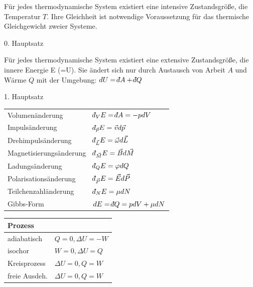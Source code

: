 \documentclass[12pt,a4paper, twoside]{article}
\renewcommand{\=}[1]{\stackrel{#1}{=}}
\def\dbar{{\mathchar'26\mkern-12mu d}}
\def\dbar{{\mathchar'26\mkern-12mu d}}
\theoremstyle{definition}
\theoremstyle{remark}
\begin{document}
\begin{center}
\begin{framed} \noindent Für jedes thermodynamische System existiert eine intensive Zustandsgröße, die Temperatur $T$. Ihre Gleichheit ist notwendige Voraussetzung für das thermische Gleichgewicht zweier Systeme.
\begin{center} 0. Hauptsatz\end{center}\end{framed}
\end{center}

\begin{center}
\begin{framed}
\noindent Für jedes thermodynamische System existiert eine extensive Zustandsgröße, die innere Energie E (=U). Sie ändert sich nur durch Austausch von Arbeit $A$ und Wärme $Q$ mit der Umgebung: $dU = \dbar A + \dbar Q$
\begin{center} 1. Hauptsatz\end{center}\end{framed}
\end{center}

\begin{center}
\begin{framed}
\begin{tabular}{ll}
Volumenänderung & $\dbar_V E = \dbar A = - p dV$\\
Impulsänderung & $\dbar_{\vec p}E = \vec v d\vec p$\\
Drehimpulsänderung & $\dbar_{\vec L}E = \vec \omega d\vec L$\\
Magnetisierungsänderung & $\dbar_{\vec M}E = \vec B d\vec M$\\
Ladungsänderung & $\dbar_Q E = \varphi dQ$\\
Polarisationsänderung & $\dbar_{\vec P}E = \vec E d\vec P$\\
Teilchenzahländerung & $\dbar_N E = \mu dN$\\
Gibbs-Form & $dE = \dbar Q = p dV + \mu dN$\\
\end{tabular}
\end{framed}
\end{center}

\begin{center}
\begin{framed}
\begin{tabular}{ll}
Prozess & \\
\midrule
adiabatisch & $Q = 0, \Delta U = -W$ \\
isochor & $W = 0, \Delta U = Q$ \\
Kreisprozess & $\Delta U = 0, Q = W$ \\
freie Ausdeh. & $\Delta U = 0, Q = W$
\end{tabular}
\end{framed}
\end{center}
\end{document}
